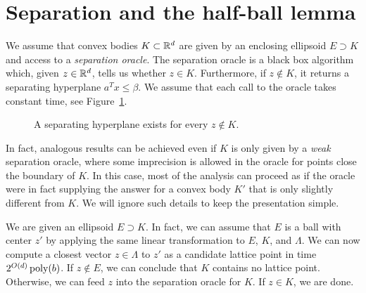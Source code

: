 \section{Separation and the half-ball lemma}

We assume that convex bodies $K \subset \mathbb{R}^d$ are given by an enclosing ellipsoid $E \supset K$
and access to a \emph{separation oracle}.
The separation oracle is a black box algorithm which, given $z \in \mathbb{R}^d$,
tells us whether $z \in K$.
Furthermore, if $z \not\in K$, it returns a separating hyperplane $a^Tx \leq \beta$.
We assume that each call to the oracle takes constant time,
see Figure~\ref{fig:separating-hyperplane}.
\begin{figure}
  \begin{center}
  \end{center}
  \caption{A separating hyperplane exists for every $z \not\in K$.}
  \label{fig:separating-hyperplane}
\end{figure}

\begin{remark}
  In fact, analogous results can be achieved even if $K$ is only given by a \emph{weak} separation oracle,
  where some imprecision is allowed in the oracle for points close the boundary of $K$.
  In this case, most of the analysis can proceed as if the oracle were in fact supplying the answer
  for a convex body $K'$ that is only slightly different from $K$.
  We will ignore such details to keep the presentation simple.
\end{remark}

We are given an ellipsoid $E \supset K$.
In fact, we can assume that $E$ is a ball with center $z'$
by applying the same linear transformation to $E$, $K$, and $\Lambda$.
We can now compute a closest vector $z \in \Lambda$ to $z'$ as a candidate lattice point
in time $2^{O(d)} \operatorname{poly}(b)$.
If $z \not\in E$, we can conclude that $K$ contains no lattice point.
Otherwise, we can feed $z$ into the separation oracle for $K$.
If $z \in K$, we are done.

